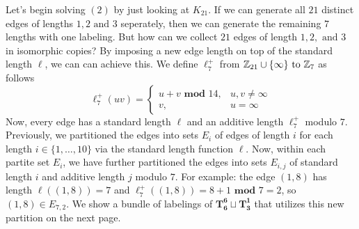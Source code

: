   Let's begin solving $(2)$ by just looking at $K_{21}$. If we can generate all $21$ distinct edges of lengths $1,2\text{ and }3$ seperately, then we can generate the remaining $7$ lengths with one labeling. But how can we collect $21$ edges of length $1,2,\text{ and }3$ in isomorphic copies? By imposing a new edge length on top of the standard length $\ell$, we can can achieve this. We define $\ell_{7}^{+}$ from $\mathbb{Z}_{21}\cup\{\infty\}\text{ to }\mathbb{Z}_{7}$ as follows
  $$\ell_{7}^{+}(uv)=\begin{cases} u+v\textbf{ mod }14, & u,v\neq \infty\\ v, &u=\infty \end{cases}$$
  Now, every edge has a standard length $\ell$ and an additive length $\ell_{7}^{+}$ modulo $7$. Previously, we partitioned the edges into sets $E_{i}$ of edges of length $i$ for each length $i\in \{1,\hdots, 10\}$ via the standard length function $\ell$. Now, within each partite set $E_{i}$, we have further partitioned the edges into sets $E_{i,j}$ of standard length $i$ and additive length $j$ modulo $7$. For example: the edge $(1,8)$ has length $\ell((1,8))=7$ and $\ell_{7}^{+}((1,8))=8+1 \textbf{ mod }7=2$, so $(1,8)\in E_{7,2}$. We show a bundle of labelings of $\mathbf{T_{6}^{6}}\sqcup \mathbf{T_{3}^{1}}$ that utilizes this new partition on the next page.

